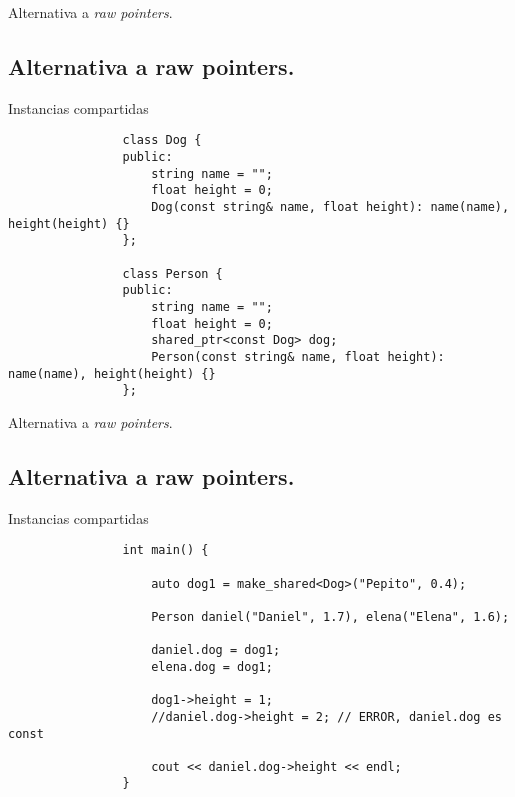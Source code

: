 \documentclass{beamer}
\newcommand{\normalSizeItem}[1] {
  \normalsize{\item #1}
}
\begin{document}
		\begin{frame}[fragile]{Alternativa a \textit{raw pointers}. }	
			\subsection{Alternativa a raw pointers. }
	
			\begin{itemize}
			
				\normalSizeItem { Instancias compartidas }
				\begin{lstlisting}
				class Dog {
				public:
					string name = "";
					float height = 0;	
					Dog(const string& name, float height): name(name), height(height) {}
				};
				
				class Person {
				public:
					string name = "";
					float height = 0;
					shared_ptr<const Dog> dog;
					Person(const string& name, float height): name(name), height(height) {}
				};
				\end{lstlisting}				
			\end{itemize}
		\end{frame}
		
		\begin{frame}[fragile]{Alternativa a \textit{raw pointers}. }	
			\subsection{Alternativa a raw pointers. }
	
			\begin{itemize}
			
				\normalSizeItem { Instancias compartidas }
				\begin{lstlisting}
				int main() {

					auto dog1 = make_shared<Dog>("Pepito", 0.4);
					
					Person daniel("Daniel", 1.7), elena("Elena", 1.6);
					
					daniel.dog = dog1;
					elena.dog = dog1;
					
					dog1->height = 1;
					//daniel.dog->height = 2; // ERROR, daniel.dog es const
					
					cout << daniel.dog->height << endl;
				}
				\end{lstlisting}				
			\end{itemize}
		\end{frame}
		
\end{document}
